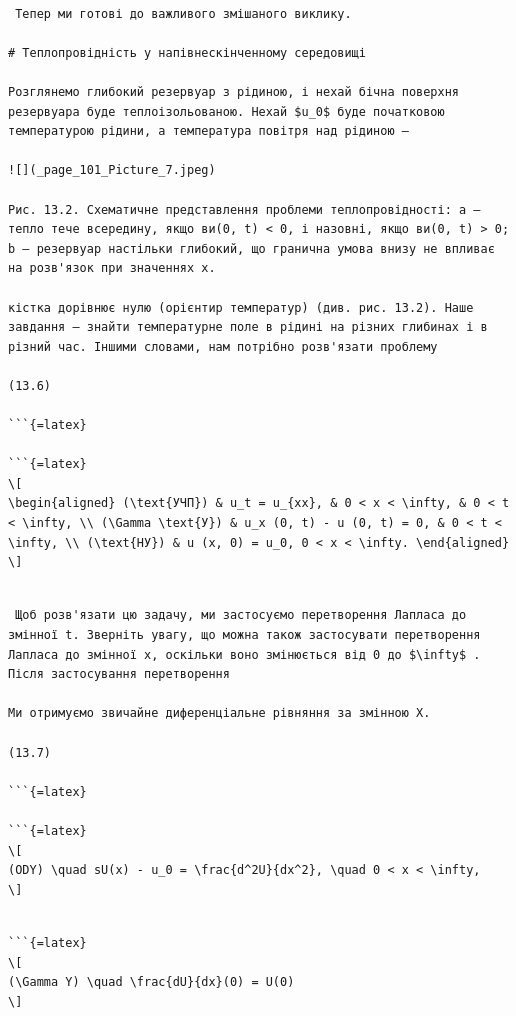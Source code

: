 \documentclass[
  ukrainian,
]{article}
\begin{document}
\begin{verbatim}

 Тепер ми готові до важливого змішаного виклику.

# Теплопровідність у напівнескінченному середовищі

Розглянемо глибокий резервуар з рідиною, і нехай бічна поверхня резервуара буде теплоізольованою. Нехай $u_0$ буде початковою температурою рідини, а температура повітря над рідиною —

![](_page_101_Picture_7.jpeg)

Рис. 13.2. Схематичне представлення проблеми теплопровідності: a — тепло тече всередину, якщо ви(0, t) < 0, і назовні, якщо ви(0, t) > 0; b — резервуар настільки глибокий, що гранична умова внизу не впливає на розв'язок при значеннях x.

кістка дорівнює нулю (орієнтир температур) (див. рис. 13.2). Наше завдання — знайти температурне поле в рідині на різних глибинах і в різний час. Іншими словами, нам потрібно розв'язати проблему

(13.6)

```{=latex}

```{=latex}
\[
\begin{aligned} (\text{УЧП}) & u_t = u_{xx}, & 0 < x < \infty, & 0 < t < \infty, \\ (\Gamma \text{У}) & u_x (0, t) - u (0, t) = 0, & 0 < t < \infty, \\ (\text{НУ}) & u (x, 0) = u_0, 0 < x < \infty. \end{aligned}
\]
\end{verbatim}

\begin{verbatim}

 Щоб розв'язати цю задачу, ми застосуємо перетворення Лапласа до змінної t. Зверніть увагу, що можна також застосувати перетворення Лапласа до змінної x, оскільки воно змінюється від 0 до $\infty$ . Після застосування перетворення

Ми отримуємо звичайне диференціальне рівняння за змінною X.

(13.7)

```{=latex}

```{=latex}
\[
(ODY) \quad sU(x) - u_0 = \frac{d^2U}{dx^2}, \quad 0 < x < \infty,
\]
\end{verbatim}

\begin{verbatim}

```{=latex}
\[
(\Gamma Y) \quad \frac{dU}{dx}(0) = U(0)
\]
\end{verbatim}
\end{document}
